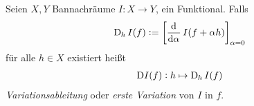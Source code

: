 \begin{definition}[Funktionalableitung]
Seien $X,Y$ Bannachräume $I:X\to
Y$, ein Funktional.
Falls
\begin{equation}
\Dif_{\,h} I(f):=\left[\dod{}{\alpha}I(f+\alpha
h)\right]_{\alpha=0}\label{eq:varderdef}
\end{equation}
für alle $h\in X$ existiert heißt 
\begin{equation}
\begin{split}
\Dif I(f):h\mapsto \Dif_{\,h} I(f)
\end{split}
\end{equation}
\emph{Variationsableitung} oder \emph{erste Variation} von $I$ in $f$.
\end{definition}
